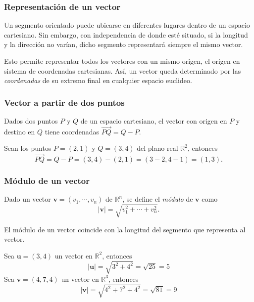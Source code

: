 \begin{frame}
	\frametitle{Representación de un vector}
	Un segmento orientado puede ubicarse en diferentes lugares dentro de un espacio cartesiano. 
	Sin embargo, con independencia de donde esté situado, si la longitud y la dirección no varían, dicho segmento
	representará siempre el mismo vector.
	
	Esto permite representar todos los vectores con un mismo origen, el origen en sistema de coordenadas cartesianas.
	Así, un vector queda determinado por las \emph{coordenadas} de su extremo final en cualquier espacio euclideo.
	
	\begin{center}
		\scalebox{0.8}{}
	\end{center}
\end{frame} 


\begin{frame}
	\frametitle{Vector a partir de dos puntos}
	Dados dos puntos $P$ y $Q$ de un espacio cartesiano, el vector con origen en $P$ y destino en $Q$ tiene coordenadas $\vec{PQ}=Q-P$.
	
	Sean los puntos $P=(2,1)$  y $Q=(3,4)$ del plano real $\mathbb{R}^2$, entonces
	\[
		\vec{PQ} = Q-P = (3,4)-(2,1) = (3-2,4-1) = (1,3).
	\]
	\begin{center}
		\scalebox{0.8}{}
	\end{center}
\end{frame} 


\begin{frame}
	\frametitle{Módulo de un vector}
	\begin{definicion}
		Dado un vector $\mathbf{v}=(v_1,\cdots,v_n)$ de $\mathbb{R}^n$, se define el \emph{módulo} de $\mathbf{v}$ como
		\[
			|\mathbf{v}| = \sqrt{v_1^2+ \cdots + v_n^2}.
		\]
	\end{definicion}
	El módulo de un vector coincide con la longitud del segmento que representa al vector.
	
	Sea $\mathbf{u}=(3,4)$ un vector en $\mathbb{R}^2$, entonces
	\[
		|\mathbf{u}| = \sqrt{3^2+4^2} = \sqrt{25} = 5
	\]
	Sea $\mathbf{v}=(4,7,4)$ un vector en $\mathbb{R}^3$, entonces
	\[
		|\mathbf{v}| = \sqrt{4^2+7^2+4^2} = \sqrt{81} = 9
	\]
\end{frame} 


